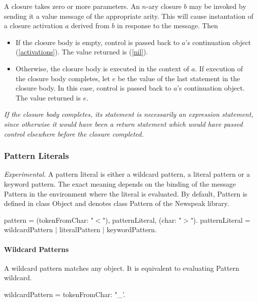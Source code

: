 \documentclass{article}
\newcommand{\code}[1]{{\sf #1}}
\begin{document}
A closure takes zero or more parameters. An $n$-ary closure $b$ may be invoked by sending it a \code{value} message of the appropriate arity. This will cause instantation of a closure activation $a$ derived from $b$ in response to the message. Then
\begin{itemize} 
\item If  the closure body is empty,  control is passed back to $a$'s continuation object (\ref{activations}). The value returned is \NIL{ } (\ref{nil}).
\item Otherwise, the closure body is executed in the context of $a$. If execution of the closure body completes, let $e$ be the value of the last statement in the closure body. In this case, control is passed back to $a$'s continuation object. The value returned is $e$.
\end{itemize}
{\it If the closure  body completes, its statement is necessarily an expression statement, since otherwise it would have been a return statement which would have passed control elsewhere before the closure completed.}

\subsubsection{Pattern Literals}
\label{patLiteral}

{\it Experimental.} A pattern literal is either a wildcard pattern, a literal pattern or a keyword pattern. The exact meaning depends on the binding of the message \code{Pattern} in the environment where the literal is evaluated. By default, \code{Pattern} is defined in class \code{Object} and denotes class \code{Pattern} of the Newspeak library. 

\begin{newspeak}
pattern = (tokenFromChar: "$<$"), patternLiteral, (char: "$>$"). 
patternLiteral = wildcardPattern $|$ literalPattern $|$ keywordPattern.
\end{newspeak}


\paragraph{Wildcard Patterns}
\label{wildcardPattern}

A wildcard pattern matches any object. It is equivalent to evaluating \code{Pattern wildcard}.

\begin{newspeak}
wildcardPattern = tokenFromChar: "\_'.
\end{newspeak}
\end{document}
